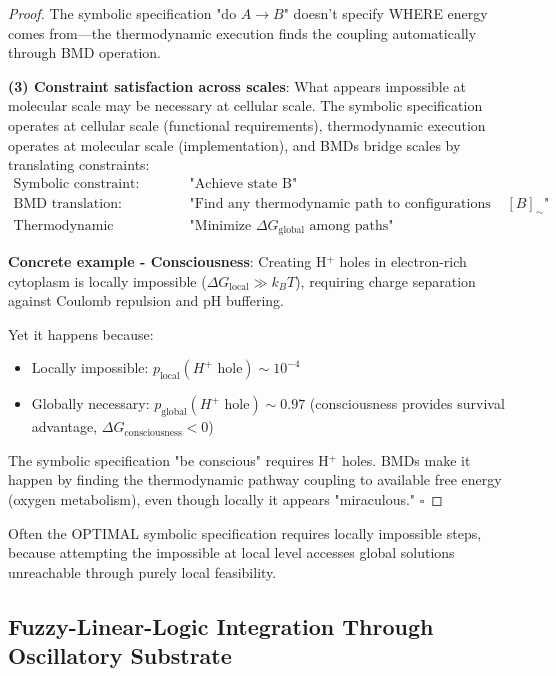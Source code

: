 \begin{proof}
The symbolic specification "do $A \to B$" doesn't specify WHERE energy comes from—the thermodynamic execution finds the coupling automatically through BMD operation.

\textbf{(3) Constraint satisfaction across scales}: What appears impossible at molecular scale may be necessary at cellular scale. The symbolic specification operates at cellular scale (functional requirements), thermodynamic execution operates at molecular scale (implementation), and BMDs bridge scales by translating constraints:
\begin{align}
\text{Symbolic constraint:} \quad &\text{"Achieve state B"} \\
\text{BMD translation:} \quad &\text{"Find any thermodynamic path to configurations in } [B]_{\sim}\text{"} \\
\text{Thermodynamic execution:} \quad &\text{"Minimize } \Delta G_{\text{global}} \text{ among paths"}
\end{align}

\textbf{Concrete example - Consciousness}: Creating H\(^+\) holes in electron-rich cytoplasm is locally impossible ($\Delta G_{\text{local}} \gg k_B T$), requiring charge separation against Coulomb repulsion and pH buffering.

Yet it happens because:
\begin{itemize}
\item Locally impossible: $p_{\text{local}}(H^+ \text{ hole}) \sim 10^{-4}$
\item Globally necessary: $p_{\text{global}}(H^+ \text{ hole}) \sim 0.97$ (consciousness provides survival advantage, $\Delta G_{\text{consciousness}} < 0$)
\end{itemize}

The symbolic specification "be conscious" requires H\(^+\) holes. BMDs make it happen by finding the thermodynamic pathway coupling to available free energy (oxygen metabolism), even though locally it appears "miraculous." $\square$
\end{proof}

\begin{corollary}
Often the OPTIMAL symbolic specification requires locally impossible steps, because attempting the impossible at local level accesses global solutions unreachable through purely local feasibility.
\end{corollary}

\subsection{Fuzzy-Linear-Logic Integration Through Oscillatory Substrate}

